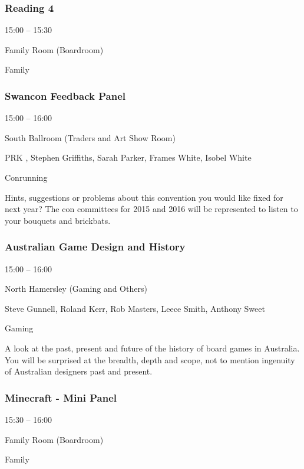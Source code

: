 \documentclass{scrreprt}
\begin{document}
\begin{multicols}{2}
\subsubsection*{Reading 4}\begin{description}
\setlength{\itemsep}{0pt}
\setlength{\parsep}{0pt}
\setlength{\parskip}{0pt}
\item[Time:]{15:00 -- 15:30}
\item[Venue:]{Family Room (Boardroom)}
\item[Tags:]{Family}\end{description}

\subsubsection*{Swancon Feedback Panel}\begin{description}
\setlength{\itemsep}{0pt}
\setlength{\parsep}{0pt}
\setlength{\parskip}{0pt}
\item[Time:]{15:00 -- 16:00}
\item[Venue:]{South Ballroom (Traders and Art Show Room)}
\item[People:]{PRK , Stephen Griffiths, Sarah Parker, Frames White, Isobel White}
\item[Tags:]{Conrunning}\end{description}
Hints, suggestions or problems about this convention you would like fixed for next year? The con committees for 2015 and 2016 will be represented to listen to your bouquets and brickbats.
\subsubsection*{Australian Game Design and History}\begin{description}
\setlength{\itemsep}{0pt}
\setlength{\parsep}{0pt}
\setlength{\parskip}{0pt}
\item[Time:]{15:00 -- 16:00}
\item[Venue:]{North Hamersley (Gaming and Others)}
\item[People:]{Steve Gunnell, Roland Kerr, Rob Masters, Leece Smith, Anthony Sweet}
\item[Tags:]{Gaming}\end{description}
A look at the past, present and future of the history of board games in Australia. You will be surprised at the breadth, depth and scope, not to mention ingenuity of Australian designers past and present.
\subsubsection*{Minecraft - Mini Panel}\begin{description}
\setlength{\itemsep}{0pt}
\setlength{\parsep}{0pt}
\setlength{\parskip}{0pt}
\item[Time:]{15:30 -- 16:00}
\item[Venue:]{Family Room (Boardroom)}
\item[Tags:]{Family}\end{description}


\end{multicols}
\end{document}
